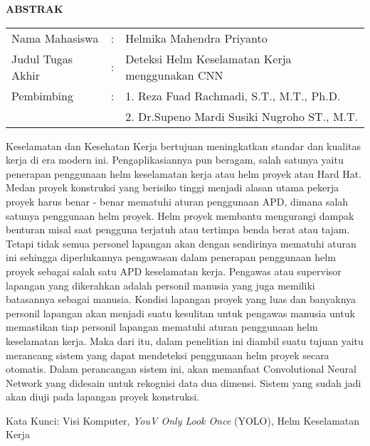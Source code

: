 \begin{center}
  \large\textbf{ABSTRAK}
\end{center}


\vspace{2ex}

\begingroup
  \setlength{\tabcolsep}{0pt}

  \noindent
  \begin{tabularx}{\textwidth}{l >{\centering}m{2em} X}
    Nama Mahasiswa    &:& Helmika Mahendra Priyanto \\

    Judul Tugas Akhir &:&	Deteksi Helm Keselamatan Kerja menggunakan CNN \\

    Pembimbing        &:& 1. Reza Fuad Rachmadi, S.T., M.T., Ph.D. \\
                      & & 2. Dr.Supeno Mardi Susiki Nugroho ST., M.T. \\
  \end{tabularx}
\endgroup

Keselamatan dan Kesehatan Kerja bertujuan meningkatkan standar dan kualitas kerja di era modern ini. Pengaplikasiannya pun beragam, salah satunya yaitu penerapan penggunaan helm keselamatan kerja atau helm proyek atau Hard Hat. Medan proyek konstruksi yang berisiko tinggi menjadi alasan utama pekerja proyek harus benar - benar mematuhi aturan penggunaan APD, dimana salah satunya penggunaan helm proyek. Helm proyek membantu mengurangi dampak benturan misal saat pengguna terjatuh atau tertimpa benda berat atau tajam. Tetapi tidak semua personel lapangan akan dengan sendirinya mematuhi aturan ini sehingga diperlukannya pengawasan dalam penerapan penggunaan helm proyek sebagai salah satu APD keselamatan kerja. Pengawas atau supervisor lapangan yang dikerahkan adalah personil manusia yang juga memiliki batasannya sebagai manusia. Kondisi lapangan proyek yang luas dan banyaknya personil lapangan akan menjadi suatu kesulitan untuk pengawas manusia untuk memastikan tiap personil lapangan mematuhi aturan penggunaan helm keselamatan kerja. Maka dari itu, dalam penelitian ini diambil suatu tujuan yaitu merancang sistem yang dapat mendeteksi penggunaan helm proyek secara otomatis. Dalam perancangan sistem ini, akan memanfaat Convolutional Neural Network yang didesain untuk rekognisi data dua dimensi. Sistem yang sudah jadi akan diuji pada lapangan proyek konstruksi.


Kata Kunci: Visi Komputer, \emph{YouV Only Look Once} (YOLO), Helm Keselamatan Kerja
